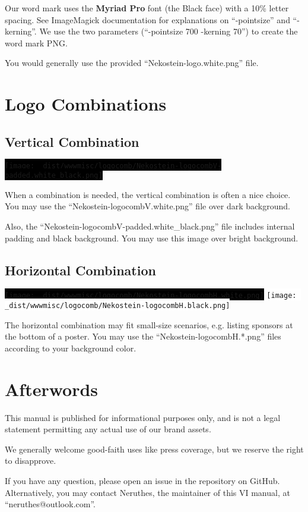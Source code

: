 \documentclass[a4paper,11pt]{report}
\newcommand{\altfbox}[1]{%
    \colorbox{black}{#1}%
}
\begin{document}
Our word mark uses the \textbf{Myriad Pro} font (the Black face) with a 10\% letter spacing.
See ImageMagick documentation for explanations on ``-pointsize'' and ``-kerning''.
We use the two parameters (``-pointsize 700 -kerning 70'') to create the word mark PNG.

You would generally use the provided ``Nekostein-logo.white.png'' file.






\chapter{Logo Combinations}

\section{Vertical Combination}
\altfbox{\texttt{[image: \_dist/wwwmisc/logocomb/Nekostein-logocombV-padded.white\_black.png]}}

When a combination is needed, the vertical combination is often a nice choice.
You may use the ``Nekostein-logocombV.white.png'' file over dark background.

Also, the ``Nekostein-logocombV-padded.white\_black.png'' file includes internal padding and black background.
You may use this image over bright background.

\section{Horizontal Combination}
\altfbox{\texttt{[image: \_dist/wwwmisc/logocomb/Nekostein-logocombH.white.png]}}\hfill%
\colorbox{white}{\texttt{[image: \_dist/wwwmisc/logocomb/Nekostein-logocombH.black.png]}}

The horizontal combination may fit small-size scenarios, e.g. listing sponsors at the bottom of a poster.
You may use the ``Nekostein-logocombH.*.png'' files according to your background color.








\chapter{Afterwords}
This manual is published for informational purposes only,
and is not a legal statement permitting any actual use of our brand assets.

We generally welcome good-faith uses like press coverage,
but we reserve the right to disapprove.

If you have any question, please open an issue in the repository on GitHub.
Alternatively, you may contact Neruthes, the maintainer of this VI manual, at ``neruthes@outlook.com''.
\end{document}
